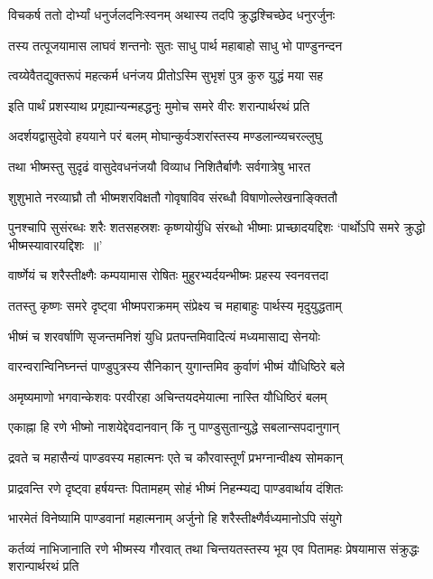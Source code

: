\twolineshloka
{विचकर्ष ततो दोर्भ्यां धनुर्जलदनिःस्वनम्}
{अथास्य तदपि क्रुद्धश्चिच्छेद धनुरर्जुनः}


\twolineshloka
{तस्य तत्पूजयामास लाघवं शन्तनोः सुतः}
{साधु पार्थ महाबाहो साधु भो पाण्डुनन्दन}


\twolineshloka
{त्वय्येवैतद्युक्तरूपं महत्कर्म धनंजय}
{प्रीतोऽस्मि सुभृशं पुत्र कुरु युद्धं मया सह}


\twolineshloka
{इति पार्थं प्रशस्याथ प्रगृह्यान्यन्महद्धनुः}
{मुमोच समरे वीरः शरान्पार्थरथं प्रति}


\twolineshloka
{अदर्शयद्वासुदेवो हययाने परं बलम्}
{मोघान्कुर्वञ्शरांस्तस्य मण्डलान्व्यचरल्लुघु}


\twolineshloka
{तथा भीष्मस्तु सुदृढं वासुदेवधनंजयौ}
{विव्याध निशितैर्बाणैः सर्वगात्रेषु भारत}


\twolineshloka
{शुशुभाते नरव्याघ्रौ तौ भीष्मशरविक्षतौ}
{गोवृषाविव संरब्धौ विषाणोल्लेखनाङ्क्तितौ}


\threelineshloka
{पुनश्चापि सुसंरब्धः शरैः शतसहस्रशः}
{कृष्णयोर्युधि संरब्धो भीष्माः प्राच्छादयद्दिशः}
{`पार्थोऽपि समरे क्रुद्धो भीष्मस्यावारयद्दिशः ॥'}


\twolineshloka
{वार्ष्णेयं च शरैस्तीक्ष्णैः कम्पयामास रोषितः}
{मुहुरभ्यर्दयन्भीष्मः प्रहस्य स्वनवत्तदा}


\twolineshloka
{ततस्तु कृष्णः समरे दृष्ट्वा भीष्मपराक्रमम्}
{संप्रेक्ष्य च महाबाहुः पार्थस्य मृदुयुद्धताम्}


\twolineshloka
{भीष्मं च शरवर्षाणि सृजन्तमनिशं युधि}
{प्रतपन्तमिवादित्यं मध्यमासाद्य सेनयोः}


\twolineshloka
{वारन्वरान्विनिघ्नन्तं पाण्डुपुत्रस्य सैनिकान्}
{युगान्तमिव कुर्वाणं भीष्मं यौधिष्ठिरे बले}


\twolineshloka
{अमृष्यमाणो भगवान्केशवः परवीरहा}
{अचिन्तयदमेयात्मा नास्ति यौधिष्ठिरं बलम्}


\twolineshloka
{एकाह्ना हि रणे भीष्मो नाशयेद्देवदानवान्}
{किं नु पाण्डुसुतान्युद्धे सबलान्सपदानुगान्}


\twolineshloka
{द्रवते च महासैन्यं पाण्डवस्य महात्मनः}
{एते च कौरवास्तूर्णं प्रभग्नान्वीक्ष्य सोमकान्}


\twolineshloka
{प्राद्रवन्ति रणे दृष्ट्वा हर्षयन्तः पितामहम्}
{सोहं भीष्मं निहन्म्यद्य पाण्डवार्थाय दंशितः}


\twolineshloka
{भारमेतं विनेष्यामि पाण्डवानां महात्मनाम्}
{अर्जुनो हि शरैस्तीक्ष्णैर्वध्यमानोऽपि संयुगे}


\threelineshloka
{कर्तव्यं नाभिजानाति रणे भीष्मस्य गौरवात्}
{तथा चिन्तयतस्तस्य भूय एव पितामहः}
{प्रेषयामास संक्रुद्धः शरान्पार्थरथं प्रति}


